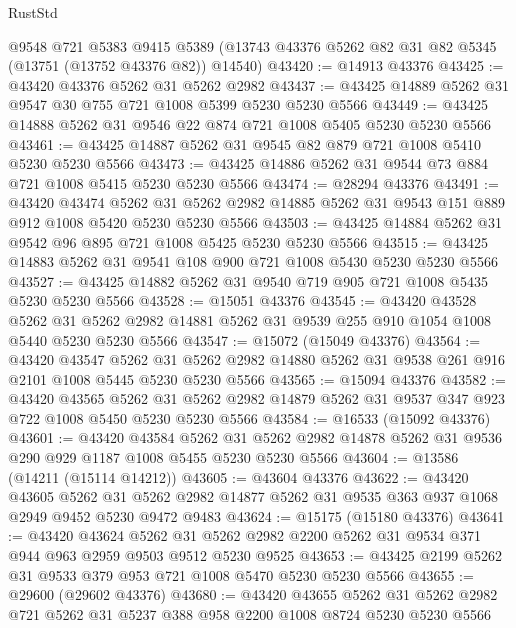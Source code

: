 \begin{lexlean}{RustStd}
\begin{coremodule}
    @9548
    @721
    @5383
    @9415
    @5389
    (@13743 @43376 @5262 @82 @31 @82 @5345 (@13751 (@13752 @43376 @82)) @14540)
@43420 := @14913 @43376
@43425 := @43420 @43376 @5262 @31 @5262 @2982
@43437 := @43425 @14889 @5262 @31 @9547 @30 @755 @721 @1008 @5399 @5230 @5230 @5566
@43449 := @43425 @14888 @5262 @31 @9546 @22 @874 @721 @1008 @5405 @5230 @5230 @5566
@43461 := @43425 @14887 @5262 @31 @9545 @82 @879 @721 @1008 @5410 @5230 @5230 @5566
@43473 := @43425 @14886 @5262 @31 @9544 @73 @884 @721 @1008 @5415 @5230 @5230 @5566
@43474 := @28294 @43376
@43491 := @43420
    @43474
    @5262
    @31
    @5262
    @2982
    @14885
    @5262
    @31
    @9543
    @151
    @889
    @912
    @1008
    @5420
    @5230
    @5230
    @5566
@43503 := @43425 @14884 @5262 @31 @9542 @96 @895 @721 @1008 @5425 @5230 @5230 @5566
@43515 := @43425 @14883 @5262 @31 @9541 @108 @900 @721 @1008 @5430 @5230 @5230 @5566
@43527 := @43425 @14882 @5262 @31 @9540 @719 @905 @721 @1008 @5435 @5230 @5230 @5566
@43528 := @15051 @43376
@43545 := @43420
    @43528
    @5262
    @31
    @5262
    @2982
    @14881
    @5262
    @31
    @9539
    @255
    @910
    @1054
    @1008
    @5440
    @5230
    @5230
    @5566
@43547 := @15072 (@15049 @43376)
@43564 := @43420
    @43547
    @5262
    @31
    @5262
    @2982
    @14880
    @5262
    @31
    @9538
    @261
    @916
    @2101
    @1008
    @5445
    @5230
    @5230
    @5566
@43565 := @15094 @43376
@43582 := @43420
    @43565
    @5262
    @31
    @5262
    @2982
    @14879
    @5262
    @31
    @9537
    @347
    @923
    @722
    @1008
    @5450
    @5230
    @5230
    @5566
@43584 := @16533 (@15092 @43376)
@43601 := @43420
    @43584
    @5262
    @31
    @5262
    @2982
    @14878
    @5262
    @31
    @9536
    @290
    @929
    @1187
    @1008
    @5455
    @5230
    @5230
    @5566
@43604 := @13586 (@14211 (@15114 @14212))
@43605 := @43604 @43376
@43622 := @43420
    @43605
    @5262
    @31
    @5262
    @2982
    @14877
    @5262
    @31
    @9535
    @363
    @937
    @1068
    @2949
    @9452
    @5230
    @9472
    @9483
@43624 := @15175 (@15180 @43376)
@43641 := @43420
    @43624
    @5262
    @31
    @5262
    @2982
    @2200
    @5262
    @31
    @9534
    @371
    @944
    @963
    @2959
    @9503
    @9512
    @5230
    @9525
@43653 := @43425 @2199 @5262 @31 @9533 @379 @953 @721 @1008 @5470 @5230 @5230 @5566
@43655 := @29600 (@29602 @43376)
@43680 := @43420
    @43655
    @5262
    @31
    @5262
    @2982
    @721
    @5262
    @31
    @5237
    @388
    @958
    @2200
    @1008
    @8724
    @5230
    @5230
    @5566

\end{coremodule}
\end{lexlean}
